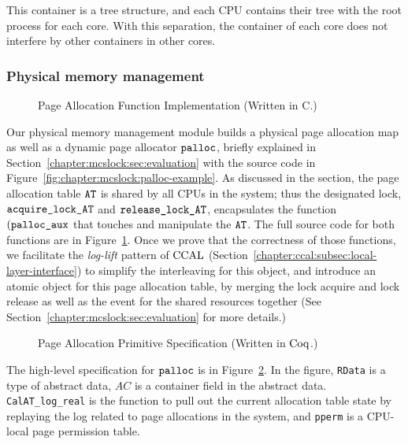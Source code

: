 This container is a tree structure, and each CPU contains their tree with the root process for each core. 
With this separation, the container of each core does not interfere by other containers in other cores. 

\subsubsection{Physical memory management} 
\begin{figure}
 
\caption{Page Allocation Function Implementation (Written in C.)}
\label{fig:chapter:certikos:palloc-in-c}
\end{figure}
Our physical memory management module builds a physical page allocation map as well as a dynamic page allocator ${\mathrm{\texttt{palloc}}}$, briefly explained 
in Section~\ref{chapter:mcslock:sec:evaluation} with the source code in Figure~\ref{fig:chapter:mcslock:palloc-example}.
As discussed in the section, the page allocation table ${\mathrm{\texttt{AT}}}$ is shared by 
all CPUs in the system; thus
the designated lock, ${\mathrm{\texttt{acquire\_lock\_AT}}}$ and  ${\mathrm{\texttt{release\_lock\_AT}}}$,
encapsulates the function $({\mathrm{\texttt{palloc\_aux}}}$ that touches and manipulate the ${\mathrm{\texttt{AT}}}$.
The full source code for both functions are in Figure~\ref{fig:chapter:certikos:palloc-in-c}.
Once we prove that the correctness of those functions, we facilitate 
the \textit{log-lift} pattern of $\mathrm{CCAL}$ (Section~\ref{chapter:ccal:subsec:local-layer-interface}) to simplify the interleaving for this object,
and introduce 
an atomic object for this page allocation table, by merging the lock acquire and lock release as well as 
the event for the shared resources together (See Section~\ref{chapter:mcslock:sec:evaluation} for more details.)
\begin{figure}
 
\caption{Page Allocation Primitive Specification (Written in $\mathrm{Coq}$.)}
\label{fig:chapter:certikos:palloc-in-coq}
\end{figure}
The high-level specification for ${\mathrm{\texttt{palloc}}}$ is in Figure~\ref{fig:chapter:certikos:palloc-in-coq}.
In the figure, \lstinline$RData$ is a type of abstract data, $AC$ is a container field in the abstract data. 
\lstinline$CalAT_log_real$ is the function to pull out the current allocation table state by replaying  the log
related to page allocations in the system, and \lstinline$pperm$ is a CPU-local page permission table. 
